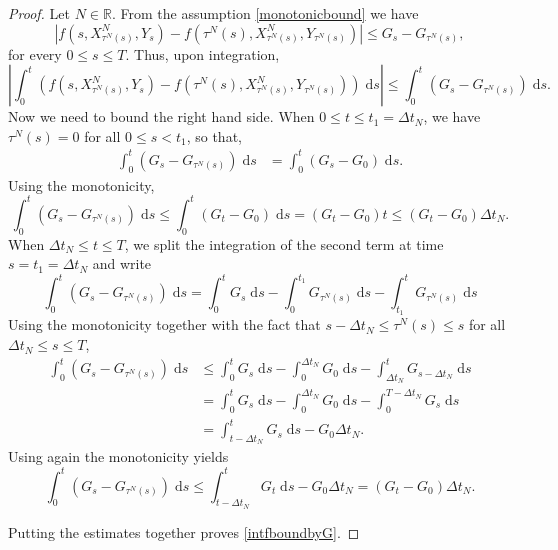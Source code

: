 \documentclass[reqno,12pt]{amsart}
\theoremstyle{plain}%
\theoremstyle{definition}
\begin{document}
\begin{proof}
    Let $N\in \mathbb{R}$. From the assumption \eqref{monotonicbound} we have
    \[
        |f(s, X_{\tau^N(s)}^N, Y_s) - f(\tau^N(s), X_{\tau^N(s)}^N, Y_{\tau^N(s)})| \leq G_s - G_{\tau^N(s)},
    \]
    for every $0\leq s \leq T$. Thus, upon integration,
    \[
        \left|\int_0^t \left( f(s, X_{\tau^N(s)}^N, Y_s) - f(\tau^N(s), X_{\tau^N(s)}^N, Y_{\tau^N(s)}) \right)\;\mathrm{d}s\right| \leq \int_0^t (G_s - G_{\tau^N(s)})\;\mathrm{d}s.
    \]
    Now we need to bound the right hand side. When $0 \leq t\leq t_1 = \Delta t_N$, we have $\tau^N(s) = 0$ for all $0 \leq s < t_1$, so that,
    \begin{align*}
      \int_0^t (G_s - G_{\tau^N(s)})\;\mathrm{d}s & = \int_0^t (G_s - G_0) \;\mathrm{d}s.
    \end{align*}
    Using the monotonicity,
    \[
      \int_0^t (G_s - G_{\tau^N(s)})\;\mathrm{d}s \leq \int_0^t (G_t - G_0) \;\mathrm{d}s  = (G_t - G_0)t \leq (G_t - G_0)\Delta t_N.
    \]
    When $\Delta t_N\leq t \leq T$, we split the integration of the second term at time $s = t_1 = \Delta t_N$ and write
    \[ 
      \int_0^t (G_s - G_{\tau^N(s)})\;\mathrm{d}s = \int_0^t G_s \;\mathrm{d}s - \int_0^{t_1} G_{\tau^N(s)}\;\mathrm{d}s - \int_{t_1}^t G_{\tau^N(s)}\;\mathrm{d}s
    \]
    Using the monotonicity together with the fact that $s - \Delta t_N\leq \tau^N(s) \leq s$ for all $\Delta t_N\leq s \leq T$,
    \begin{align*}
        \int_0^t (G_s - G_{\tau^N(s)})\;\mathrm{d}s & \leq \int_0^t G_s \;\mathrm{d}s - \int_0^{\Delta t_N} G_0\;\mathrm{d}s - \int_{\Delta t_N}^t G_{s-\Delta t_N}\;\mathrm{d}s \\
        & = \int_0^t G_s \;\mathrm{d}s - \int_0^{\Delta t_N} G_0\;\mathrm{d}s - \int_{0}^{T-\Delta t_N} G_s\;\mathrm{d}s \\
        & = \int_{t-\Delta t_N}^t G_s \;\mathrm{d}s - G_0\Delta t_N.
    \end{align*}
    Using again the monotonicity yields
    \[ 
      \int_0^t (G_s - G_{\tau^N(s)})\;\mathrm{d}s \leq \int_{t-\Delta t_N}^t G_t \;\mathrm{d}s - G_0\Delta t_N= (G_t - G_0)\Delta t_N.
    \]

    Putting the estimates together proves \eqref{intfboundbyG}.
\end{proof}
\end{document}
